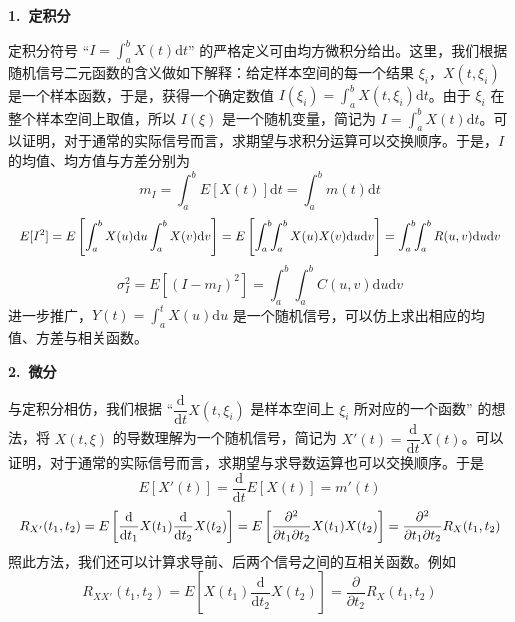 \documentclass[11pt,openany,UTF8]{ctexbook}
\newcommand{\dif}{\mathrm{d}}                      %
\newcommand{\E}{E}                                 %
\newcommand{\bhead}[1]{\par\medskip\noindent\textbf{#1}\par\smallskip}
\begin{document}
\bhead{1.\ 定积分}
定积分符号 “$I=\displaystyle\int_a^b X(t)\dif t$” 的严格定义可由均方微积分给出\nobreak。这里\nobreak，我们根据随机信号二元函数的含义做如下解释\nobreak：给定样本空间的每一个结果 $\xi_i$\nobreak，$X(t,\xi_i)$ 是一个样本函数\nobreak，于是\nobreak，获得一个确定数值 $I(\xi_i)=\displaystyle\int_a^b X(t,\xi_i)\dif t$\nobreak。由于 $\xi_i$ 在整个样本空间上取值\nobreak，所以 $I(\xi)$ 是一个随机变量\nobreak，简记为 $I=\displaystyle\int_a^b X(t)\dif t$\nobreak。可以证明\nobreak，对于通常的实际信号而言\nobreak，求期望与求积分运算可以交换顺序\nobreak。于是\nobreak，$I$ 的均值\nobreak、均方值与方差分别为
\begin{equation}
m_I=\int_a^b \E[X(t)]\dif t=\int_a^b m(t)\dif t
\label{eq:2.18}
\end{equation}
\begin{equation}
\resizebox{\linewidth}{!}{$\displaystyle
\E[I^2]=\E\left[\int_a^b X(u)\dif u\int_a^b X(v)\dif v\right]=\E\left[\int_a^b\!\!\int_a^b X(u)X(v)\dif u\dif v\right]=\int_a^b\!\!\int_a^b R(u,v)\dif u\dif v$}
\label{eq:2.19}
\end{equation}
\begin{equation}
\sigma_I^2=\E[(I-m_I)^2]=\int_a^b\!\!\int_a^b C(u,v)\dif u\dif v
\label{eq:2.20}
\end{equation}
进一步推广\nobreak，$Y(t)=\displaystyle\int_a^t X(u)\dif u$ 是一个随机信号\nobreak，可以仿上求出相应的均值\nobreak、方差与相关函数\nobreak。

\bhead{2.\ 微分}
与定积分相仿\nobreak，我们根据 “$\dfrac{\dif}{\dif t}X(t,\xi_i)$ 是样本空间上 $\xi_i$ 所对应的一个函数” 的想法\nobreak，将 $X(t,\xi)$ 的导数理解为一个随机信号\nobreak，简记为 $X'(t)=\dfrac{\dif}{\dif t}X(t)$\nobreak。可以证明\nobreak，对于通常的实际信号而言\nobreak，求期望与求导数运算也可以交换顺序\nobreak。于是
\begin{equation}
\E[X'(t)]=\frac{\dif}{\dif t}\E[X(t)]=m'(t)
\label{eq:2.21}
\end{equation}
\begin{equation}
\resizebox{\linewidth}{!}{$\displaystyle
R_{X'}(t_1,t_2)=\E\left[\frac{\dif}{\dif t_1}X(t_1)\frac{\dif}{\dif t_2}X(t_2)\right]=\E\left[\frac{\partial^2}{\partial t_1\partial t_2}X(t_1)X(t_2)\right]=\frac{\partial^2}{\partial t_1\partial t_2}R_X(t_1,t_2)$}
\label{eq:2.22}
\end{equation}
照此方法\nobreak，我们还可以计算求导前\nobreak、后两个信号之间的互相关函数\nobreak。例如
\begin{equation}
R_{XX'}(t_1,t_2)=\E\left[X(t_1)\frac{\dif}{\dif t_2}X(t_2)\right]=\frac{\partial}{\partial t_2}R_X(t_1,t_2)
\label{eq:2.23}
\end{equation}
\end{document}
